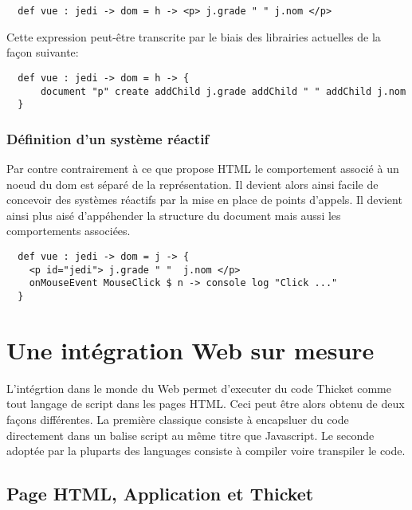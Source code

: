 \documentclass[twoside,a4paper]{article}
\begin{document}
\lstset{language=Thicket}
\begin{lstlisting}
  def vue : jedi -> dom = h -> <p> j.grade " " j.nom </p> 
\end{lstlisting}

\noindent Cette expression peut-être transcrite par le biais des librairies actuelles
de la façon suivante:

\begin{lstlisting}
  def vue : jedi -> dom = h -> {
      document "p" create addChild j.grade addChild " " addChild j.nom
  }
\end{lstlisting}

\subsubsection{Définition d'un système réactif}

Par contre contrairement à ce que propose HTML le comportement associé
à un noeud  du dom est séparé de la  représentation.  Il devient alors
ainsi facile de  concevoir des systèmes réactifs par la  mise en place
de  points  d'appels.  Il  devient ainsi  plus  aisé  d'appéhender  la
structure du document mais aussi les comportements associées.

\begin{lstlisting}
  def vue : jedi -> dom = j -> {
    <p id="jedi"> j.grade " "  j.nom </p> 
    onMouseEvent MouseClick $ n -> console log "Click ..."
  }
\end{lstlisting}


\section{Une intégration Web sur mesure}

L'intégrtion dans  le monde du  Web permet d'executer du  code Thicket
comme tout langage de script dans les pages HTML. Ceci peut être alors
obtenu de  deux façons différentes.  La première classique  consiste à
encapsluer du code directement dans un balise script au même titre que
Javascript. Le seconde adoptée par la pluparts des languages consiste 
à compiler voire transpiler le code.

\subsection{Page HTML, Application et Thicket}
\end{document}
